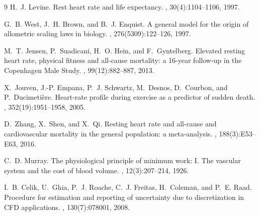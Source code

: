 \documentclass[11pt,a4paper]{article}
\begin{document}
\begin{thebibliography}{9}
H.~J. Levine.
\newblock Rest heart rate and life expectancy.
, 30(4):1104--1106, 1997.

G.~B. West, J.~H. Brown, and B.~J. Enquist.
\newblock A general model for the origin of allometric scaling laws in biology.
, 276(5309):122--126, 1997.

M.~T. Jensen, P.~Suadicani, H.~O. Hein, and F.~Gyntelberg.
\newblock Elevated resting heart rate, physical fitness and all-cause mortality: a 16-year follow-up in the Copenhagen Male Study.
, 99(12):882--887, 2013.

X.~Jouven, J.-P. Empana, P.~J. Schwartz, M.~Desnos, D.~Courbon, and P.~Ducimeti\`ere.
\newblock Heart-rate profile during exercise as a predictor of sudden death.
, 352(19):1951--1958, 2005.

D.~Zhang, X.~Shen, and X.~Qi.
\newblock Resting heart rate and all-cause and cardiovascular mortality in the general population: a meta-analysis.
, 188(3):E53--E63, 2016.

C.~D. Murray.
\newblock The physiological principle of minimum work: I. The vascular system and the cost of blood volume.
, 12(3):207--214, 1926.

I.~B. Celik, U.~Ghia, P.~J. Roache, C.~J. Freitas, H.~Coleman, and P.~E. Raad.
\newblock Procedure for estimation and reporting of uncertainty due to discretization in CFD applications.
, 130(7):078001, 2008.
\end{thebibliography}
\end{document}
